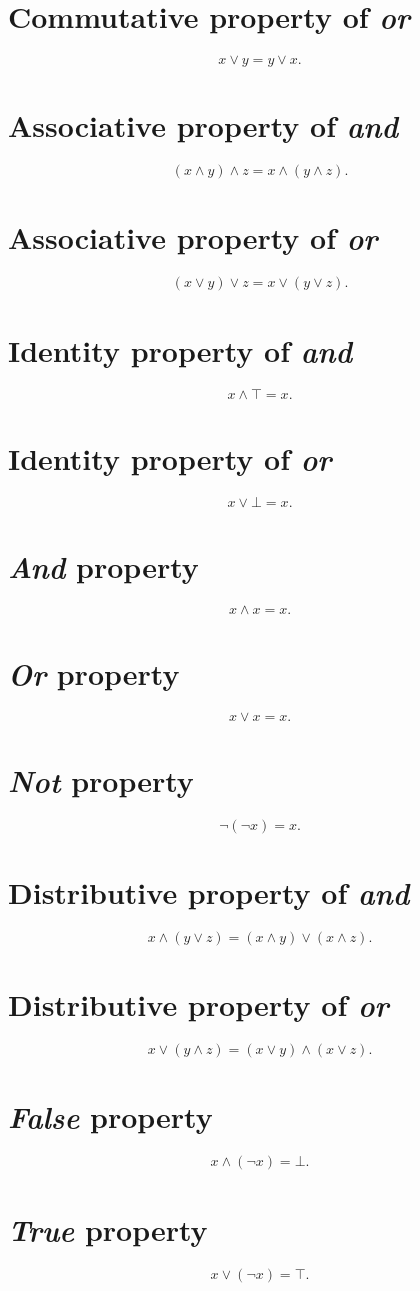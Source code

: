 \documentclass[12pt]{article}
\begin{document}
\section*{Commutative property of \textit{or}}
\[x\lor y=y\lor x.\]
\section*{Associative property of \textit{and}}
\[(x\land y)\land z=x\land(y\land z).\]
\section*{Associative property of \textit{or}}
\[(x\lor y)\lor z=x\lor(y\lor z).\]
\section*{Identity property of \textit{and}}
\[x\land\top=x.\]
\section*{Identity property of \textit{or}}
\[x\lor\bot=x.\]
\section*{\textit{And} property}
\[x\land x=x.\]
\section*{\textit{Or} property}
\[x\lor x=x.\]
\section*{\textit{Not} property}
\[\lnot(\lnot x)=x.\]
\section*{Distributive property of \textit{and}}
\[x\land(y\lor z)=(x\land y)\lor(x\land z).\]
\section*{Distributive property of \textit{or}}
\[x\lor(y\land z)=(x\lor y)\land(x\lor z).\]
\section*{\textit{False} property}
\[x\land(\lnot x)=\bot.\]
\section*{\textit{True} property}
\[x\lor(\lnot x)=\top.\]
\end{document}
